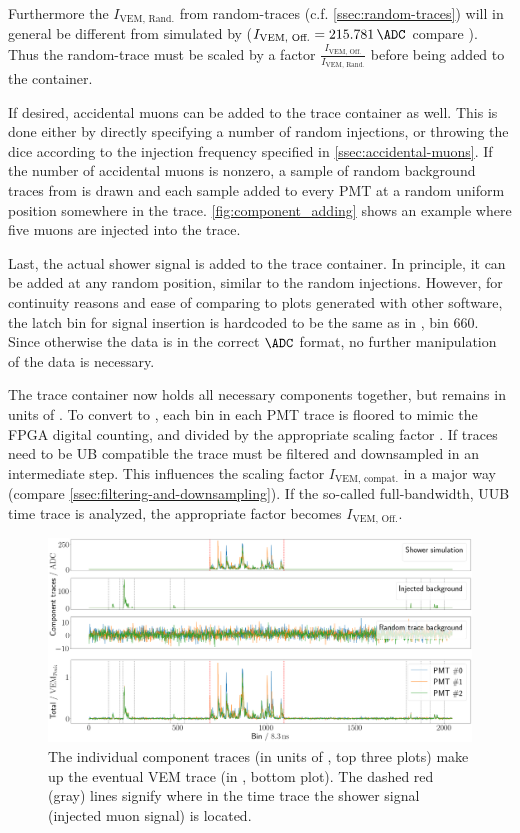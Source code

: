 Furthermore the $I_\text{VEM, Rand.}$ from random-traces (c.f. \autoref{ssec:random-traces}) will in general be different from \Ipeak simulated by 
\Offline ($I_\text{VEM, Off.} = \SI{215.781}{\ADC}$ compare \cite{offlineSource}). Thus the random-trace must be scaled by a factor 
$\frac{I_\text{VEM, Off.}}{I_\text{VEM, Rand.}}$ before being added to the container. 

If desired, accidental muons can be added to the trace container as well. This is done either by directly specifying a number of random injections, or throwing the
dice according to the injection frequency specified in \autoref{ssec:accidental-muons}. If the number of accidental muons is nonzero, a sample of random background
traces from \cite{DavidBackgroundSim} is drawn and each sample added to every PMT at a random uniform position somewhere in the trace. 
\autoref{fig:component_adding} shows an example where five muons are injected into the trace.

Last, the actual shower signal is added to the trace container. In principle, it can be added at any random position, similar to the random injections. However, for 
continuity reasons and ease of comparing to plots generated with other software, the latch bin for signal insertion is hardcoded to be the same as in \Offline, 
bin $660$. Since otherwise the data is in the correct $\SI{}{\ADC}$ format, no further manipulation of the data is necessary.

The trace container now holds all necessary components together, but remains in units of \SI{}{\ADC}. To convert to \SI{}{\Peak}, each bin in each PMT trace is 
floored to mimic the FPGA digital counting, and divided by the appropriate scaling factor \Ipeak. If traces need to be UB compatible the trace must be filtered and
downsampled in an intermediate step. This influences the scaling factor $I_\text{VEM, compat.}$ in a major way (compare \autoref{ssec:filtering-and-downsampling}). 
If the so-called full-bandwidth, UUB time trace is analyzed, the appropriate factor becomes $I_\text{VEM, Off.}$.

\begin{figure}
	\centering
	\includegraphics[width=\textwidth]{./plots/component_adding.png}
	\caption{The individual component traces (in units of \SI{}{\ADC}, top three plots) make up the eventual VEM trace (in \SI{}{\Peak}, bottom plot). The dashed 
    red (gray) lines signify where in the time trace the shower signal (injected muon signal) is located.}
	\label{fig:component_adding}
\end{figure}

